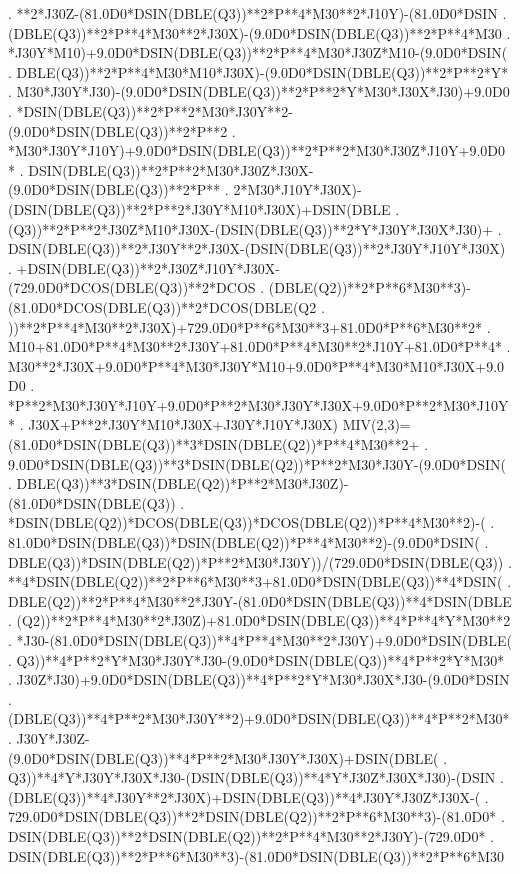 \begin{framedverbatim}
     . **2*J30Z-(81.0D0*DSIN(DBLE(Q3))**2*P**4*M30**2*J10Y)-(81.0D0*DSIN
     . (DBLE(Q3))**2*P**4*M30**2*J30X)-(9.0D0*DSIN(DBLE(Q3))**2*P**4*M30
     . *J30Y*M10)+9.0D0*DSIN(DBLE(Q3))**2*P**4*M30*J30Z*M10-(9.0D0*DSIN(
     . DBLE(Q3))**2*P**4*M30*M10*J30X)-(9.0D0*DSIN(DBLE(Q3))**2*P**2*Y*
     . M30*J30Y*J30)-(9.0D0*DSIN(DBLE(Q3))**2*P**2*Y*M30*J30X*J30)+9.0D0
     . *DSIN(DBLE(Q3))**2*P**2*M30*J30Y**2-(9.0D0*DSIN(DBLE(Q3))**2*P**2
     . *M30*J30Y*J10Y)+9.0D0*DSIN(DBLE(Q3))**2*P**2*M30*J30Z*J10Y+9.0D0*
     . DSIN(DBLE(Q3))**2*P**2*M30*J30Z*J30X-(9.0D0*DSIN(DBLE(Q3))**2*P**
     . 2*M30*J10Y*J30X)-(DSIN(DBLE(Q3))**2*P**2*J30Y*M10*J30X)+DSIN(DBLE
     . (Q3))**2*P**2*J30Z*M10*J30X-(DSIN(DBLE(Q3))**2*Y*J30Y*J30X*J30)+
     . DSIN(DBLE(Q3))**2*J30Y**2*J30X-(DSIN(DBLE(Q3))**2*J30Y*J10Y*J30X)
     . +DSIN(DBLE(Q3))**2*J30Z*J10Y*J30X-(729.0D0*DCOS(DBLE(Q3))**2*DCOS
     . (DBLE(Q2))**2*P**6*M30**3)-(81.0D0*DCOS(DBLE(Q3))**2*DCOS(DBLE(Q2
     . ))**2*P**4*M30**2*J30X)+729.0D0*P**6*M30**3+81.0D0*P**6*M30**2*
     . M10+81.0D0*P**4*M30**2*J30Y+81.0D0*P**4*M30**2*J10Y+81.0D0*P**4*
     . M30**2*J30X+9.0D0*P**4*M30*J30Y*M10+9.0D0*P**4*M30*M10*J30X+9.0D0
     . *P**2*M30*J30Y*J10Y+9.0D0*P**2*M30*J30Y*J30X+9.0D0*P**2*M30*J10Y*
     . J30X+P**2*J30Y*M10*J30X+J30Y*J10Y*J30X)
      MIV(2,3)=(81.0D0*DSIN(DBLE(Q3))**3*DSIN(DBLE(Q2))*P**4*M30**2+
     . 9.0D0*DSIN(DBLE(Q3))**3*DSIN(DBLE(Q2))*P**2*M30*J30Y-(9.0D0*DSIN(
     . DBLE(Q3))**3*DSIN(DBLE(Q2))*P**2*M30*J30Z)-(81.0D0*DSIN(DBLE(Q3))
     . *DSIN(DBLE(Q2))*DCOS(DBLE(Q3))*DCOS(DBLE(Q2))*P**4*M30**2)-(
     . 81.0D0*DSIN(DBLE(Q3))*DSIN(DBLE(Q2))*P**4*M30**2)-(9.0D0*DSIN(
     . DBLE(Q3))*DSIN(DBLE(Q2))*P**2*M30*J30Y))/(729.0D0*DSIN(DBLE(Q3))
     . **4*DSIN(DBLE(Q2))**2*P**6*M30**3+81.0D0*DSIN(DBLE(Q3))**4*DSIN(
     . DBLE(Q2))**2*P**4*M30**2*J30Y-(81.0D0*DSIN(DBLE(Q3))**4*DSIN(DBLE
     . (Q2))**2*P**4*M30**2*J30Z)+81.0D0*DSIN(DBLE(Q3))**4*P**4*Y*M30**2
     . *J30-(81.0D0*DSIN(DBLE(Q3))**4*P**4*M30**2*J30Y)+9.0D0*DSIN(DBLE(
     . Q3))**4*P**2*Y*M30*J30Y*J30-(9.0D0*DSIN(DBLE(Q3))**4*P**2*Y*M30*
     . J30Z*J30)+9.0D0*DSIN(DBLE(Q3))**4*P**2*Y*M30*J30X*J30-(9.0D0*DSIN
     . (DBLE(Q3))**4*P**2*M30*J30Y**2)+9.0D0*DSIN(DBLE(Q3))**4*P**2*M30*
     . J30Y*J30Z-(9.0D0*DSIN(DBLE(Q3))**4*P**2*M30*J30Y*J30X)+DSIN(DBLE(
     . Q3))**4*Y*J30Y*J30X*J30-(DSIN(DBLE(Q3))**4*Y*J30Z*J30X*J30)-(DSIN
     . (DBLE(Q3))**4*J30Y**2*J30X)+DSIN(DBLE(Q3))**4*J30Y*J30Z*J30X-(
     . 729.0D0*DSIN(DBLE(Q3))**2*DSIN(DBLE(Q2))**2*P**6*M30**3)-(81.0D0*
     . DSIN(DBLE(Q3))**2*DSIN(DBLE(Q2))**2*P**4*M30**2*J30Y)-(729.0D0*
     . DSIN(DBLE(Q3))**2*P**6*M30**3)-(81.0D0*DSIN(DBLE(Q3))**2*P**6*M30

\end{framedverbatim}
